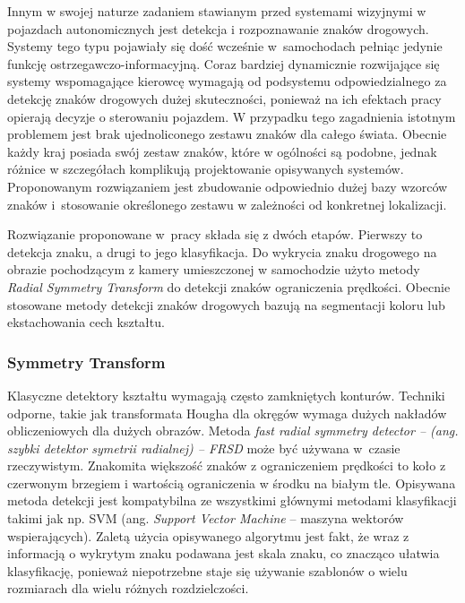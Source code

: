 Innym w swojej naturze zadaniem stawianym przed systemami wizyjnymi w pojazdach autonomicznych jest detekcja i rozpoznawanie znaków drogowych. %
Systemy tego typu pojawiały się dość wcześnie w~samochodach pełniąc jedynie funkcję ostrzegawczo-informacyjną.
Coraz bardziej dynamicznie rozwijające się systemy wspomagające kierowcę wymagają od podsystemu odpowiedzialnego za detekcję znaków drogowych dużej skuteczności, ponieważ na ich efektach pracy opierają decyzje o sterowaniu pojazdem. %
W przypadku tego zagadnienia istotnym problemem jest brak ujednoliconego zestawu znaków dla całego świata. %
Obecnie każdy kraj posiada swój zestaw znaków, które w ogólności są podobne, jednak różnice w szczegółach komplikują projektowanie opisywanych systemów. %
Proponowanym rozwiązaniem jest zbudowanie odpowiednio dużej bazy wzorców znaków i~stosowanie określonego zestawu w zależności od konkretnej lokalizacji. 

Rozwiązanie proponowane w~pracy \cite{T2} składa się z dwóch etapów. 
Pierwszy to detekcja znaku, a drugi to jego klasyfikacja. 
Do wykrycia znaku drogowego na obrazie pochodzącym z kamery umieszczonej w samochodzie użyto metody \textit{Radial Symmetry Transform} do detekcji znaków ograniczenia prędkości. 
Obecnie stosowane metody detekcji znaków drogowych bazują na segmentacji koloru lub ekstachowania cech kształtu. %

\subsubsection{Symmetry Transform}

Klasyczne detektory kształtu wymagają często zamkniętych konturów. 
Techniki odporne, takie jak transformata Hougha dla okręgów wymaga dużych nakładów obliczeniowych dla dużych obrazów. 
Metoda \textit{\textit{fast radial symmetry detector} -- (ang. szybki detektor symetrii radialnej) -- FRSD} może być używana w~czasie rzeczywistym. %
Znakomita większość znaków z ograniczeniem prędkości to koło z czerwonym brzegiem i wartością ograniczenia w środku na białym tle. 
Opisywana metoda detekcji jest kompatybilna ze wszystkimi głównymi metodami klasyfikacji takimi jak np. SVM (ang. \textit{Support Vector Machine} -- maszyna wektorów wspierających). 
Zaletą użycia opisywanego algorytmu jest fakt, że wraz z informacją o wykrytym znaku podawana jest skala znaku, co znacząco ułatwia klasyfikację, ponieważ niepotrzebne staje się używanie szablonów o wielu rozmiarach dla wielu różnych rozdzielczości. %

